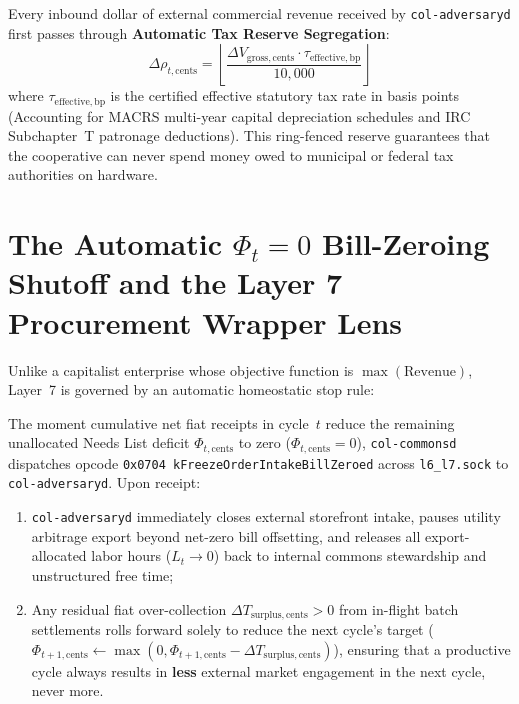 Every inbound dollar of external commercial revenue received by \texttt{col-adversaryd} first passes through \textbf{Automatic Tax Reserve Segregation}:
\begin{equation}
\Delta \rho_{t,\mathrm{cents}} = \left\lfloor \frac{\Delta V_{\mathrm{gross,cents}} \cdot \tau_{\mathrm{effective,bp}}}{10{,}000} \right\rfloor
\label{eq:ch6-tax-segregation}
\end{equation}
where $\tau_{\mathrm{effective,bp}}$ is the certified effective statutory tax rate in basis points (Accounting for MACRS multi-year capital depreciation schedules and IRC Subchapter~T patronage deductions). This ring-fenced reserve guarantees that the cooperative can never spend money owed to municipal or federal tax authorities on hardware.

\section{The Automatic \texorpdfstring{$\Phi_t = 0$}{Phi\_t = 0} Bill-Zeroing Shutoff and the Layer 7 Procurement Wrapper Lens}
\label{sec:l7-bill-zeroing-shutoff}

Unlike a capitalist enterprise whose objective function is $\max(\text{Revenue})$, Layer~7 is governed by an automatic homeostatic stop rule:
\begin{theorem}[The Automatic $\Phi_t = 0$ Bill-Zeroing Shutoff]
\label{thm:l7-bill-zeroing}
The moment cumulative net fiat receipts in cycle~$t$ reduce the remaining unallocated Needs List deficit $\Phi_{t,\mathrm{cents}}$ to zero ($\Phi_{t,\mathrm{cents}} = 0$), \texttt{col-commonsd} dispatches opcode \texttt{0x0704 kFreezeOrderIntakeBillZeroed} across \texttt{l6\_l7.sock} to \texttt{col-adversaryd}. Upon receipt:
\begin{enumerate}
    \item \texttt{col-adversaryd} immediately closes external storefront intake, pauses utility arbitrage export beyond net-zero bill offsetting, and releases all export-allocated labor hours ($L_t \to 0$) back to internal commons stewardship and unstructured free time;
    \item Any residual fiat over-collection $\Delta T_{\mathrm{surplus,cents}} > 0$ from in-flight batch settlements rolls forward solely to reduce the next cycle's target ($\Phi_{t+1,\mathrm{cents}} \leftarrow \max(0, \Phi_{t+1,\mathrm{cents}} - \Delta T_{\mathrm{surplus,cents}})$), ensuring that a productive cycle always results in \textbf{less} external market engagement in the next cycle, never more.
\end{enumerate}
\end{theorem}

